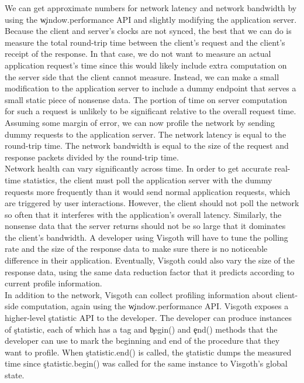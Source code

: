   We can get approximate numbers for network latency and network bandwidth by
  using the \c{window.performance} API and slightly modifying the application
  server. Because the client and server's clocks are not synced, the best that
  we can do is measure the total round-trip time between the client's request
  and the client's receipt of the response. In that case, we do not want to
  measure an actual application request's time since this would likely include
  extra computation on the server side that the client cannot measure. Instead,
  we can make a small modification to the application server to include a dummy
  endpoint that serves a small static piece of nonsense data. The portion of
  time on server computation for such a request is unlikely to be significant
  relative to the overall request time.\\

  Assuming some margin of error, we can now profile the network by sending
  dummy requests to the application server. The network latency is equal to
  the round-trip time. The network bandwidth is equal to the size of the
  request and response packets divided by the round-trip time.\\

  Network health can vary significantly across time. In order to get accurate
  real-time statistics, the client must poll the application server with the
  dummy requests more frequently than it would send normal application
  requests, which are triggered by user interactions. However, the client
  should not poll the network so often that it interferes with the
  application's overall latency. Similarly, the nonsense data that the server
  returns should not be so large that it dominates the client's bandwidth. A
  developer using Visgoth will have to tune the polling rate and the size of
  the response data to make sure there is no noticeable difference in their
  application. Eventually, Visgoth could also vary the size of the response
  data, using the same data reduction factor that it predicts according to
  current profile information.\\

  In addition to the network, Visgoth can collect profiling information about
  client-side computation, again using the \c{window.performance} API.
  Visgoth exposes a higher-level \c{statistic} API to the developer.  The
  developer can produce instances of \c{statistic}, each of which has a
  tag and \c{begin()} and \c{end()} methods that the developer can
  use to mark the beginning and end of the procedure that they want to profile.
  When \c{statistic.end()} is called, the \c{statistic} dumps the
  measured time since \c{statistic.begin()} was called for the same
  instance to Visgoth's global state.\\

